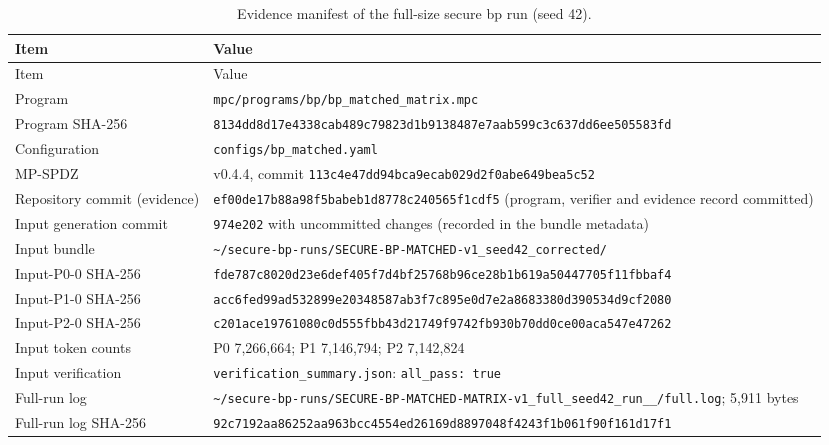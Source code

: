{\small
\begin{longtable}{@{}>{\raggedright\arraybackslash}p{3.8cm}>{\raggedright\arraybackslash}p{10.0cm}@{}}
\caption{Evidence manifest of the full-size secure \ac{bp} run (seed 42).}\label{tab:app-manifest}\\
\toprule
Item & Value \\
\midrule
\endfirsthead
\toprule
Item & Value \\
\midrule
\endhead
Program & \texttt{mpc/programs/bp/bp\_matched\_matrix.mpc} \\
Program SHA-256 & \texttt{8134dd8d17e4338c\allowbreak ab489c79823d1b91\allowbreak 38487e7aab599c3c\allowbreak 637dd6ee505583fd} \\
Configuration & \texttt{configs/bp\_matched.yaml} \\
MP-SPDZ & v0.4.4, commit \texttt{113c4e47dd94bca9\allowbreak ecab029d2f0abe64\allowbreak 9bea5c52} \\
Repository commit (evidence) & \texttt{ef00de17b88a98f5\allowbreak babeb1d8778c2405\allowbreak 65f1cdf5} (program, verifier and evidence record committed) \\
Input generation commit & \texttt{974e202} with uncommitted changes (recorded in the bundle metadata) \\
Input bundle & \texttt{\textasciitilde/secure-bp-runs/\allowbreak SECURE-BP-MATCHED-v1\_\allowbreak seed42\_\allowbreak corrected/} \\
Input-P0-0 SHA-256 & \texttt{fde787c8020d23e6\allowbreak def405f7d4bf2576\allowbreak 8b96ce28b1b619a5\allowbreak 0447705f11fbbaf4} \\
Input-P1-0 SHA-256 & \texttt{acc6fed99ad53289\allowbreak 9e20348587ab3f7c\allowbreak 895e0d7e2a868338\allowbreak 0d390534d9cf2080} \\
Input-P2-0 SHA-256 & \texttt{c201ace19761080c\allowbreak 0d555fbb43d21749\allowbreak f9742fb930b70dd0\allowbreak ce00aca547e47262} \\
Input token counts & P0 7{,}266{,}664; P1 7{,}146{,}794; P2 7{,}142{,}824 \\
Input verification & \texttt{verification\_summary.json}: \texttt{all\_pass: true} \\
Full-run log & \texttt{\textasciitilde/secure-bp-runs/\allowbreak SECURE-BP-MATCHED-MATRIX-v1\_\allowbreak full\_\allowbreak seed42\_\allowbreak run\_\allowbreak 20261115\_\allowbreak 234946/\allowbreak full.log}; 5{,}911 bytes \\
Full-run log SHA-256 & \texttt{92c7192aa86252aa\allowbreak 963bcc4554ed2616\allowbreak 9d8897048f4243f1\allowbreak b061f90f161d17f1} \\

\end{longtable}}
